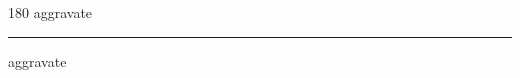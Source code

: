 
\begin{frame}
\begin{center}
\begin{turn}{180}
{\fontsize{2.5cm}{1em}\selectfont aggravate}
\end{turn}
\vspace{1em}\par  
\hrule
\vspace{1em}\par  
{\fontsize{2.5cm}{1em}\selectfont aggravate}
\end{center}
\end{frame}
